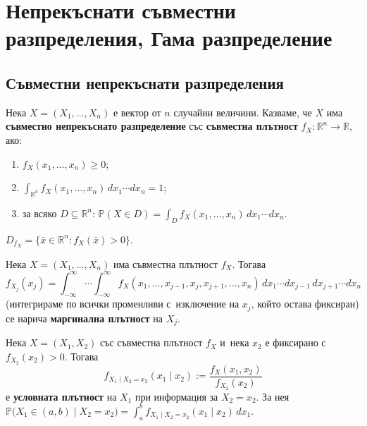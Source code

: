 \chapter{Непрекъснати съвместни разпределения, Гама разпределение}

\section{Съвместни непрекъснати разпределения}

\begin{defbox}
Нека $X=(X_1,\dots,X_n)$ е вектор от $n$ случайни величини.
Казваме, че $X$ има \textbf{съвместно непрекъснато разпределение} със
\textbf{съвместна плътност} $f_X:\mathbb R^n\to\mathbb R$, ако:
\begin{enumerate}[label=\arabic*)]
  \item $f_X(x_1,\dots,x_n)\ge0$;
  \item $\displaystyle\int_{\mathbb R^n} f_X(x_1,\dots,x_n)\,dx_1\cdots dx_n = 1$;
  \item за всяко $D\subseteq\mathbb R^n$: $\displaystyle\mathbb P(X\in D) = \int_D f_X(x_1,\dots,x_n)\,dx_1\cdots dx_n$.
\end{enumerate}
\end{defbox}

\begin{defbox}[~(Носител)]
$D_{f_X} = \{\bar x\in\mathbb R^n : f_X(\bar x)>0\}$.
\end{defbox}

\begin{defbox}
Нека $X=(X_1,\dots,X_n)$ има съвместна плътност $f_X$. Тогава
\[
  f_{X_j}(x_j) = \int_{-\infty}^{\infty}\cdots\int_{-\infty}^{\infty} f_X(x_1,\dots,x_{j-1},x_j,x_{j+1},\dots,x_n)\,dx_1\cdots dx_{j-1}\,dx_{j+1}\cdots dx_n
\]
(интегрираме по всички променливи с~изключение на $x_j$, който
остава фиксиран) се нарича \textbf{маргинална плътност} на $X_j$.
\end{defbox}

\begin{defbox}
Нека $X=(X_1,X_2)$ със съвместна плътност $f_X$ и~нека $x_2$ е
фиксирано с~$f_{X_2}(x_2)>0$. Тогава
\[
  f_{X_1\mid X_2=x_2}(x_1\mid x_2) := \frac{f_X(x_1,x_2)}{f_{X_2}(x_2)}
\]
е \textbf{условната плътност} на $X_1$ при информация за $X_2=x_2$.
За нея $\displaystyle\mathbb P\big(X_1\in(a,b)\mid X_2=x_2\big) =
\int_a^b f_{X_1\mid X_2=x_2}(x_1\mid x_2)\,dx_1$.
\end{defbox}

